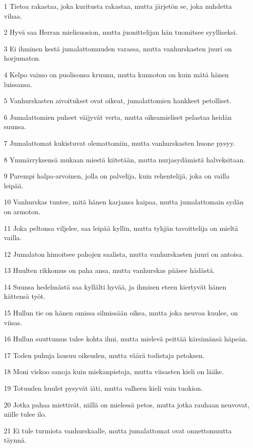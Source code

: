 \par 1 Tietoa rakastaa, joka kuritusta rakastaa, mutta järjetön se, joka nuhdetta vihaa.
\par 2 Hyvä saa Herran mielisuosion, mutta juonittelijan hän tuomitsee syylliseksi.
\par 3 Ei ihminen kestä jumalattomuuden varassa, mutta vanhurskasten juuri on horjumaton.
\par 4 Kelpo vaimo on puolisonsa kruunu, mutta kunnoton on kuin mätä hänen luissansa.
\par 5 Vanhurskasten aivoitukset ovat oikeat, jumalattomien hankkeet petolliset.
\par 6 Jumalattomien puheet väijyvät verta, mutta oikeamieliset pelastaa heidän suunsa.
\par 7 Jumalattomat kukistuvat olemattomiin, mutta vanhurskasten huone pysyy.
\par 8 Ymmärryksensä mukaan miestä kiitetään, mutta nurjasydämistä halveksitaan.
\par 9 Parempi halpa-arvoinen, jolla on palvelija, kuin rehentelijä, joka on vailla leipää.
\par 10 Vanhurskas tuntee, mitä hänen karjansa kaipaa, mutta jumalattomain sydän on armoton.
\par 11 Joka peltonsa viljelee, saa leipää kyllin, mutta tyhjän tavoittelija on mieltä vailla.
\par 12 Jumalaton himoitsee pahojen saalista, mutta vanhurskasten juuri on antoisa.
\par 13 Huulten rikkomus on paha ansa, mutta vanhurskas pääsee hädästä.
\par 14 Suunsa hedelmästä saa kyllälti hyvää, ja ihmisen eteen kiertyvät hänen kättensä työt.
\par 15 Hullun tie on hänen omissa silmissään oikea, mutta joka neuvoa kuulee, on viisas.
\par 16 Hullun suuttumus tulee kohta ilmi, mutta mielevä peittää kärsimänsä häpeän.
\par 17 Toden puhuja lausuu oikeuden, mutta väärä todistaja petoksen.
\par 18 Moni viskoo sanoja kuin miekanpistoja, mutta viisasten kieli on lääke.
\par 19 Totuuden huulet pysyvät iäti, mutta valheen kieli vain tuokion.
\par 20 Jotka pahaa miettivät, niillä on mielessä petos, mutta jotka rauhaan neuvovat, niille tulee ilo.
\par 21 Ei tule turmiota vanhurskaalle, mutta jumalattomat ovat onnettomuutta täynnä.
